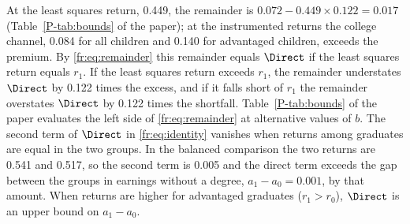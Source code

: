 At the least squares return, 0.449, the remainder is
$0.072 - 0.449 \times 0.122 = 0.017$
(Table~\ref{P-tab:bounds} of the paper); at the instrumented returns
the college channel, 0.084 for all children and 0.140 for advantaged children,
exceeds the premium. By \eqref{fr:eq:remainder} this
remainder equals $\Direct$ if the least squares return equals $r_1$. If
the least squares return exceeds $r_1$, the remainder understates
$\Direct$ by 0.122 times the excess, and if it falls short of $r_1$ the
remainder overstates $\Direct$ by 0.122 times the shortfall.
Table~\ref{P-tab:bounds} of the paper evaluates the left side of
\eqref{fr:eq:remainder} at alternative values of $b$. The second term of
$\Direct$ in \eqref{fr:eq:identity} vanishes when returns among graduates
are equal in the two groups. In the balanced comparison the two returns are 0.541 and 0.517, so the
second term is 0.005 and the direct term exceeds the gap between the groups
in earnings without a degree, $a_1 - a_0 = 0.001$, by that amount. When
returns are higher for advantaged graduates ($r_1 > r_0$), $\Direct$ is an
upper bound on $a_1 - a_0$.
